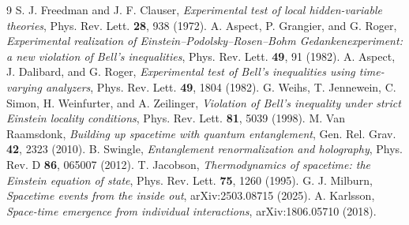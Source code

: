 \documentclass[11pt]{article}
\begin{document}
\begin{thebibliography}{9}
 S. J. Freedman and J. F. Clauser, \emph{Experimental test of local hidden-variable theories}, Phys. Rev. Lett. \textbf{28}, 938 (1972).
 A. Aspect, P. Grangier, and G. Roger, \emph{Experimental realization of Einstein--Podolsky--Rosen--Bohm Gedankenexperiment: a new violation of Bell's inequalities}, Phys. Rev. Lett. \textbf{49}, 91 (1982).
 A. Aspect, J. Dalibard, and G. Roger, \emph{Experimental test of Bell's inequalities using time-varying analyzers}, Phys. Rev. Lett. \textbf{49}, 1804 (1982).
 G. Weihs, T. Jennewein, C. Simon, H. Weinfurter, and A. Zeilinger, \emph{Violation of Bell's inequality under strict Einstein locality conditions}, Phys. Rev. Lett. \textbf{81}, 5039 (1998).
 M. Van Raamsdonk, \emph{Building up spacetime with quantum entanglement}, Gen. Rel. Grav. \textbf{42}, 2323 (2010).
 B. Swingle, \emph{Entanglement renormalization and holography}, Phys. Rev. D \textbf{86}, 065007 (2012).
 T. Jacobson, \emph{Thermodynamics of spacetime: the Einstein equation of state}, Phys. Rev. Lett. \textbf{75}, 1260 (1995).
 G. J. Milburn, \emph{Spacetime events from the inside out}, arXiv:2503.08715 (2025).
 A. Karlsson, \emph{Space-time emergence from individual interactions}, arXiv:1806.05710 (2018).
\end{thebibliography}
\end{document}
